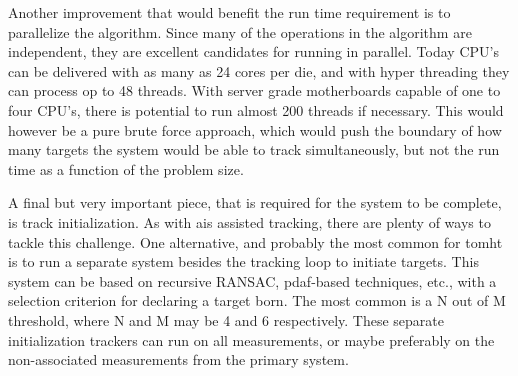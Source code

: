 Another improvement that would benefit the run time requirement is to parallelize  the algorithm. Since many of the operations in the algorithm are independent, they are excellent candidates for running in parallel. Today CPU's can be delivered with as many as 24 cores per die, and with hyper threading they can process op to 48 threads. With server grade motherboards capable of one to four CPU's, there is potential to run almost 200 threads if necessary. This would however be a pure brute force approach, which would push the boundary of how many targets the system would be able to track simultaneously, but not the run time as a function of the problem size.

A final but very important piece, that is required for the system to be complete, is track initialization. As with \gls{ais} assisted \gls{tracking}, there are plenty of ways to tackle this challenge. One alternative, and probably the most common for \gls{tomht} is to run a separate system besides the \gls{tracking} loop to initiate targets. This system can be based on recursive RANSAC, \gls{pdaf}-based techniques, etc., with a selection criterion for declaring a target born. The most common is a N out of M threshold, where N and M may be 4 and 6 respectively. These separate initialization trackers can run on all measurements, or maybe preferably on the non-associated measurements from the primary system.